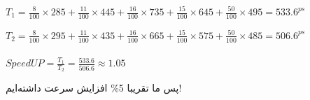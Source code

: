 \setLTR

$T_1 = \frac{8}{100} \times 285 + \frac{11}{100} \times 445 +\frac{16}{100} \times 735 + \frac{15}{100} \times 645 +\frac{50}{100} \times 495  = 533.6^{ps}$

$T_2 = \frac{8}{100} \times 295 + \frac{11}{100} \times 435 +\frac{16}{100} \times 665 + \frac{15}{100} \times 575 +\frac{50}{100} \times 485  = 506.6^{ps}$ \\ \\



$SpeedUP = \frac{T_1}{T_2} = \frac{533.6}{506.6} \approx 1.05$
\setRTL

پس ما تقریبا 5\% افزایش سرعت داشته‌ایم!